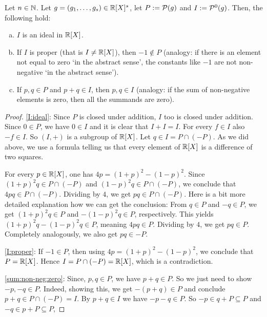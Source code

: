 \begin{lemma}
	\label{lem:ideals}
	Let $n \in \mathbb{N}$. Let $g=(g_1,\ldots,g_s) \in \mathbb{R}[X]^s$, let $P:=\mathcal{P}(g)$ and $I:=\mathcal{P}^0(g)$. Then, the following hold: 
	\begin{enumerate}[(a)]
		\item \label{I:ideal} $I$ is an ideal in $\mathbb{R}[X]$.
		\item \label{I:proper} If $I$ is proper (that is $I \ne \mathbb{R}[X]$), then $-1 \not\in P$ (analogy: if there is an element not equal to zero `in the abstract sense', the constants like $-1$ are not non-negative `in the abstract sense').
		\item \label{sum:non-neg:zero} If $p, q \in P$ and $p+q \in I$, then $p, q \in I$ (analogy: if the sum of non-negative elements is zero, then all the summands are zero). 
	\end{enumerate}
\end{lemma}
\begin{proof}
 \eqref{I:ideal}: Since $P$ is closed under addition, $I$ too is closed under addition. Since $0 \in P$, we have $0 \in I$ and it is clear that $I + I = I$. For every $f \in I$ also $-f \in I$. So $(I,+)$ is a subgroup of $\mathbb{R}[X]$. Let $q \in I = P \cap (-P)$. As we did above, we use a formula telling us that every element of $\mathbb{R}[X]$ is a difference of two squares.
 
 For every $p \in \mathbb{R}[X]$, one has $ 4 p = (1+p)^2 - (1-p)^2$. Since $(1+p)^2 q \in P \cap (-P)$ and $(1-p)^2 q \in P \cap (-P)$, we conclude that $4 p q \in P \cap (-P)$. Dividing by $4$, we get $p q \in P \cap (-P)$. Here is a bit more detailed explanation how we can get the conclusion: From $q \in P$ and $-q \in P$, we get $(1+p)^2 q \in P$ and $-(1-p)^2 q \in P$, respectively. This yields $(1+p)^2 q - (1-p)^2 q \in P$, meaning $4 p q \in P$. Dividing by $4$, we get $p q \in P$. Completely analogously, we also get $p q \in -P$. 
 
 \eqref{I:proper}: If $-1 \in P$, then using $ 4 p = (1+p)^2 - (1-p)^2$, we conclude that $P = \mathbb{R}[X]$. Hence $I=P \cap (-P) = \mathbb{R}[X]$, which is a contradiction. 
 
 \eqref{sum:non-neg:zero}: Since, $p,q \in P$, we have $p+q \in P$. So we just need to show $-p, -q \in P$. Indeed, showing this, we get $-(p+q) \in P$ and conclude $p+q \in P \cap (-P) = I$. By $p+q \in I$ we have $-p - q \in P$. So $-p \in q + P \subseteq P$ and $-q  \in p +P \subseteq P$, 
\end{proof}

